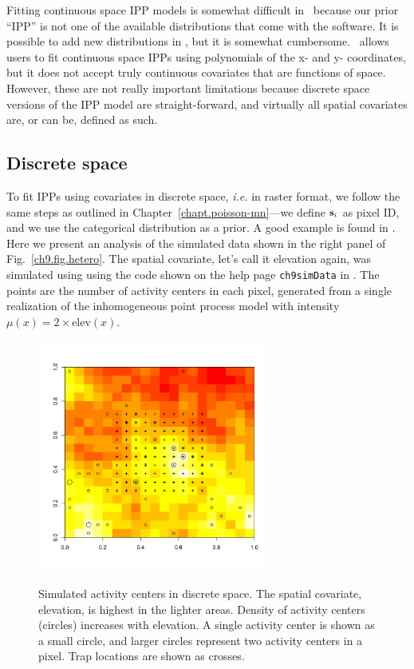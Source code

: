 Fitting continuous space IPP models is somewhat
difficult in \bugs~because our prior ``IPP'' is not one of the
available distributions that come with the software. It is
possible to add new distributions in \bugs, but it is somewhat
cumbersome.  \secr~allows
users to fit continuous space IPPs using polynomials of the x- and y-
coordinates, but it does not accept truly continuous covariates that
are functions of space. However, these
are not really important limitations because discrete
space versions of the IPP model are straight-forward, and virtually all spatial
covariates are, or can be, defined as such.


\subsection{Discrete space}

To fit IPPs using covariates in discrete space, \emph{i.e.} in raster
format, we follow the same steps
as outlined in Chapter~\ref{chapt.poisson-mn}---we define ${\bf s}_i$ as
pixel ID, and we use the categorical distribution as a prior. A good
example is found in \citep{mollet_etal:2012}. Here we present
an analysis of the simulated data shown in the right panel of
Fig.~\ref{ch9.fig.hetero}. The spatial covariate, let's call it
elevation again, was simulated
using using the code shown on the help page
\verb+ch9simData+ in \scrbook. The points are the number of
activity centers in each pixel, generated from a single realization of
the inhomogeneous point process model with intensity
$\mu(x) = 2 \times \mbox{elev}(x)$.
\begin{figure}
\centering
\includegraphics[width=3in,height=3in]{Ch11/figs/discrete}
\label{ch9.fig.discrete}
\caption{Simulated activity centers in discrete space. The spatial
  covariate, elevation, is highest in the lighter areas. Density of
  activity centers (circles) increases with elevation. A single
  activity center is shown as a small circle, and larger circles
  represent two activity centers in a pixel. Trap locations
  are shown as crosses.}
\end{figure}

